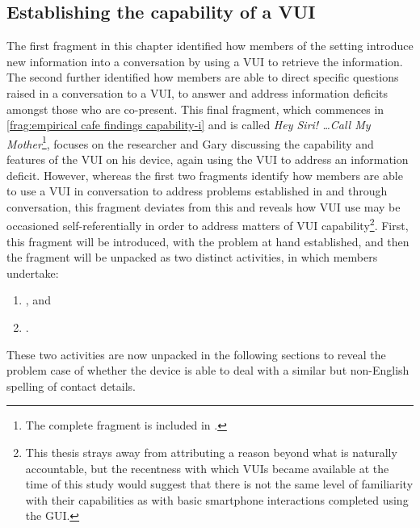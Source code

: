 \subsection{Establishing the capability of a VUI}\label{sec:empirical cafe findings capability}
\begin{revisedsubmission}
The first fragment in this chapter identified how members of the setting introduce new information into a conversation by using a \ac{VUI} to retrieve the information.
The second further identified how members are able to direct specific questions raised in a conversation to a \ac{VUI}, to answer and address information deficits amongst those who are co-present.
This final fragment, which commences in \autoref{frag:empirical cafe findings capability-i} and is called \textit{Hey Siri! \ldots Call My Mother}\footnote{The complete fragment is included in .}, focuses on the researcher and Gary discussing the capability and features of the \ac{VUI} on his device, again using the \ac{VUI} to address an information deficit.
However, whereas the first two fragments identify how members are able to use a \ac{VUI} in conversation to address problems established in and through conversation, this fragment deviates from this and reveals how \ac{VUI} use may be occasioned self-referentially in order to address matters of \ac{VUI} capability\footnote{This thesis strays away from attributing a reason beyond what is naturally accountable, but the recentness with which \acp{VUI} became available at the time of this study would suggest that there is not the same level of familiarity with their capabilities as with basic smartphone interactions completed using the \ac{GUI}.}.
First, this fragment will be introduced, with the problem at hand established, and then the fragment will be unpacked as two distinct activities, in which members undertake:
\begin{enumerate}[label=(\roman*)]
    \item {}, and
    \item {}.
\end{enumerate}

These two activities are now unpacked in the following sections to reveal the problem case of whether the device is able to deal with a similar but non-English spelling of contact details.
\end{revisedsubmission}



